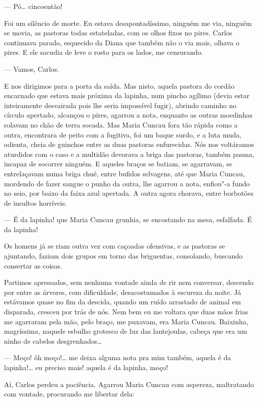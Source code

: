 --- Pó\ldots{} cincoentão!

Foi um silêncio de morte. Eu estava desapontadíssimo, ninguém me via,
ninguém se movia, as pastoras todas estateladas, com os olhos fixos no
pires. Carlos continuava parado, esquecido da Diana que também não o via
mais, olhava o pires. E ele sacudia de leve o rosto para os lados, me
censurando.

--- Vamos, Carlos.

E nos dirigimos para a porta da saída. Mas nisto, aquela pastora do
cordão encarnado que estava mais próxima da lapinha, num pincho agílimo
(devia estar inteiramente desvairada pois lhe seria impossível fugir),
abrindo caminho no círculo apertado, alcançou o pires, agarrou a nota,
enquanto as outras moedinhas rolavam no chão de terra socada. Mas Maria
Cuncau fora tão rápida como a outra, encontrara de peito com a fugitiva,
foi um baque surdo, e a luta muda, odienta, cheia de guinchos entre as
duas pastoras enfurecidas. Nós nos voltáramos aturdidos com o caso e a
multidão devorava a briga das pastoras, também pasma, incapaz de
socorrer ninguém. E aqueles braços se batiam, se agarravam, se
entrelaçavam numa briga chué, entre bufidos selvagens, até que Maria
Cuncau, mordendo de fazer sangue o punho da outra, lhe agarrou a nota,
enfiou"-a fundo no seio, por baixo da faixa azul apertada. A outra agora
chorava, entre borbotões de insultos horríveis.

--- É da lapinha! que Maria Cuncau grunhia, se encostando na mesa,
esfalfada. É da lapinha!

Os homens já se riam outra vez com caçoadas ofensivas, e as pastoras se
ajuntando, faziam dois grupos em torno das briguentas, consolando,
buscando consertar as coisas.

Partimos apressados, sem nenhuma vontade ainda de rir nem conversar,
descendo por entre as árvores, com dificuldade, desacostumados à
escureza da noite. Já estávamos quase no fim da descida, quando um ruído
arrastado de animal em disparada, cresceu por trás de nós. Nem bem eu me
voltara que duas mãos frias me agarraram pela mão, pelo braço, me
puxavam, era Maria Cuncau. Baixinha, magríssima, naquele esbulho
grotesco de luz das lantejoulas, cabeça que era um ninho de cabelos
desgrenhados\ldots{}

--- Moço! ôh moço!\ldots{} me deixa alguma nota pra mim também, aquela é da
lapinha!\ldots{} eu preciso mais! aquela é da lapinha, moço!

Aí, Carlos perdeu a paciência. Agarrou Maria Cuncau com aspereza,
maltratando com vontade, procurando me libertar dela:

